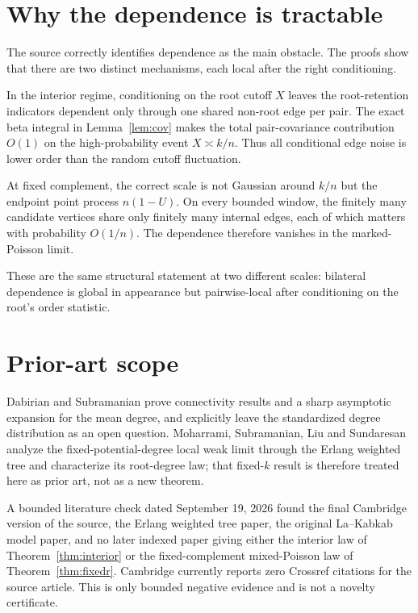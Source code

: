 \documentclass[11pt]{article}
\theoremstyle{remark}
\newcommand{\1}{\mathbf 1}
\begin{document}
\section{Why the dependence is tractable}

The source correctly identifies dependence as the main obstacle. The proofs show that there are two distinct mechanisms, each local after the right conditioning.

In the interior regime, conditioning on the root cutoff $X$ leaves the root-retention indicators dependent only through one shared non-root edge per pair. The exact beta integral in Lemma~\ref{lem:cov} makes the total pair-covariance contribution $O(1)$ on the high-probability event $X\asymp k/n$. Thus all conditional edge noise is lower order than the random cutoff fluctuation.

At fixed complement, the correct scale is not Gaussian around $k/n$ but the endpoint point process $n(1-U)$. On every bounded window, the finitely many candidate vertices share only finitely many internal edges, each of which matters with probability $O(1/n)$. The dependence therefore vanishes in the marked-Poisson limit.

These are the same structural statement at two different scales: bilateral dependence is global in appearance but pairwise-local after conditioning on the root's order statistic.

\section{Prior-art scope}

Dabirian and Subramanian prove connectivity results and a sharp asymptotic expansion for the mean degree, and explicitly leave the standardized degree distribution as an open question. Moharrami, Subramanian, Liu and Sundaresan analyze the fixed-potential-degree local weak limit through the Erlang weighted tree and characterize its root-degree law; that fixed-$k$ result is therefore treated here as prior art, not as a new theorem.

A bounded literature check dated September 19, 2026 found the final Cambridge version of the source, the Erlang weighted tree paper, the original La--Kabkab model paper, and no later indexed paper giving either the interior law of Theorem~\ref{thm:interior} or the fixed-complement mixed-Poisson law of Theorem~\ref{thm:fixedr}. Cambridge currently reports zero Crossref citations for the source article. This is only bounded negative evidence and is not a novelty certificate.
\end{document}
